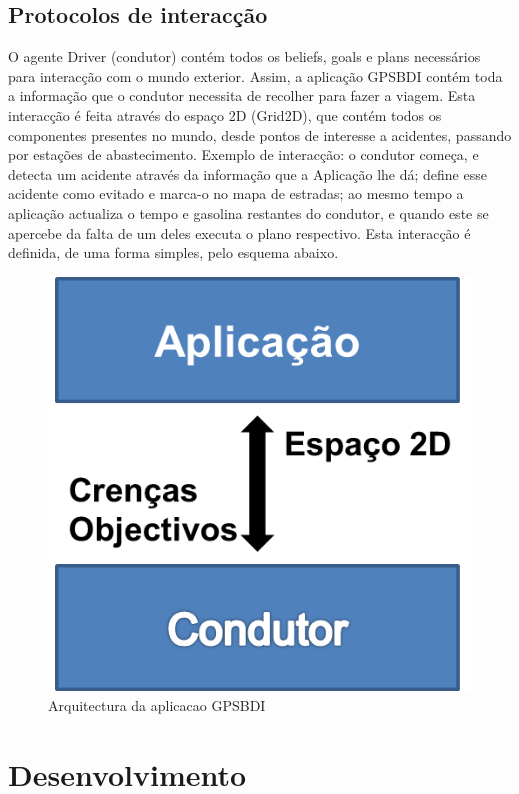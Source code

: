 \documentclass[15pt,a4paper]{article}
\begin{document}
\subsection{Protocolos de interacção}

O agente Driver (condutor) contém todos os beliefs, goals e plans necessários para interacção com o mundo exterior. Assim, a aplicação GPSBDI contém toda a informação que o condutor necessita de recolher para fazer a viagem. Esta interacção é feita através do espaço 2D (Grid2D), que contém todos os componentes presentes no mundo, desde pontos de interesse a acidentes, passando por estações de abastecimento.
Exemplo de interacção: o condutor começa, e detecta um acidente através da informação que a Aplicação lhe dá; define esse acidente como evitado e marca-o no mapa de estradas; ao mesmo tempo a aplicação actualiza o tempo e gasolina restantes do condutor, e quando este se apercebe da falta de um deles executa o plano respectivo.
Esta interacção é definida, de uma forma simples, pelo esquema abaixo.

\begin{figure}[htp]
  \centering
  \includegraphics[scale=0.5]{diagrama_interaccao_final.png}
  \caption{Arquitectura da aplicacao GPSBDI}
\end{figure}

\newpage
\section{Desenvolvimento}
\end{document}
